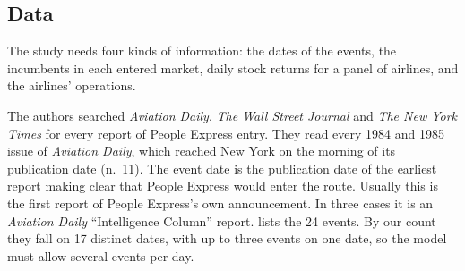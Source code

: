 \subsection{Data}\label{sec:09-wc-data}

The study needs four kinds of information: the dates of the events, the incumbents in each entered
market, daily stock returns for a panel of airlines, and the airlines' operations.

The authors searched \emph{Aviation Daily}, \emph{The Wall Street Journal} and \emph{The New York
Times} for every report of People Express entry. They read every 1984 and 1985 issue of
\emph{Aviation Daily}, which reached New York on the morning of its publication date (n.~11).
The event date is the publication date of the earliest report making clear that People Express would
enter the route. Usually this is the first report of People Express's own announcement. In three
cases it is an \emph{Aviation Daily} ``Intelligence Column'' report.  lists the
24 events. By our count they fall on 17 distinct dates, with up to three events on one date, so the
model must allow several events per day.

